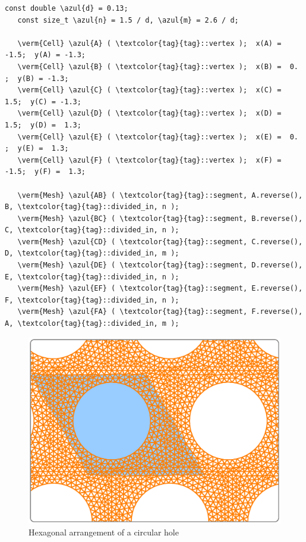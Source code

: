 \begin{Verbatim}[commandchars=\\\{\},formatcom=\small\tt,frame=single,
   label=parag-\ref{\numb section 7.\numb parag 17}.cpp,rulecolor=\color{coment},
   baselinestretch=0.94,framesep=2mm                                             ]
   const double \azul{d} = 0.13;
   const size_t \azul{n} = 1.5 / d, \azul{m} = 2.6 / d;

   \verm{Cell} \azul{A} ( \textcolor{tag}{tag}::vertex );  x(A) = -1.5;  y(A) = -1.3;
   \verm{Cell} \azul{B} ( \textcolor{tag}{tag}::vertex );  x(B) =  0. ;  y(B) = -1.3;
   \verm{Cell} \azul{C} ( \textcolor{tag}{tag}::vertex );  x(C) =  1.5;  y(C) = -1.3;
   \verm{Cell} \azul{D} ( \textcolor{tag}{tag}::vertex );  x(D) =  1.5;  y(D) =  1.3;
   \verm{Cell} \azul{E} ( \textcolor{tag}{tag}::vertex );  x(E) =  0. ;  y(E) =  1.3;
   \verm{Cell} \azul{F} ( \textcolor{tag}{tag}::vertex );  x(F) = -1.5;  y(F) =  1.3;

   \verm{Mesh} \azul{AB} ( \textcolor{tag}{tag}::segment, A.reverse(), B, \textcolor{tag}{tag}::divided_in, n );
   \verm{Mesh} \azul{BC} ( \textcolor{tag}{tag}::segment, B.reverse(), C, \textcolor{tag}{tag}::divided_in, n );
   \verm{Mesh} \azul{CD} ( \textcolor{tag}{tag}::segment, C.reverse(), D, \textcolor{tag}{tag}::divided_in, m );
   \verm{Mesh} \azul{DE} ( \textcolor{tag}{tag}::segment, D.reverse(), E, \textcolor{tag}{tag}::divided_in, n );
   \verm{Mesh} \azul{EF} ( \textcolor{tag}{tag}::segment, E.reverse(), F, \textcolor{tag}{tag}::divided_in, n );
   \verm{Mesh} \azul{FA} ( \textcolor{tag}{tag}::segment, F.reverse(), A, \textcolor{tag}{tag}::divided_in, m );
\end{Verbatim}

\begin{figure}[ht] \centering
  \includegraphics[width=140mm]{hexa-round-hole.eps}
  \caption{Hexagonal arrangement of a circular hole}
  \label{\numb section 7.\numb fig 13}
\end{figure}

